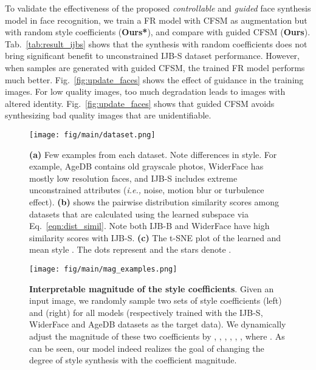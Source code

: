To validate the effectiveness of the proposed \emph{controllable} and \emph{guided} face synthesis model in face recognition, we train a FR model with CFSM as augmentation but with random style coefficients (\textbf{Ours*}), and compare with guided CFSM  (\textbf{Ours}). Tab.~\ref{tab:result_ijbs} shows that the synthesis with random coefficients does not bring significant benefit to unconstrained IJB-S dataset performance. However, when samples are generated with guided CFSM, the trained FR model performs much better. Fig.~\ref{fig:update_faces} shows the effect of guidance in the training images. For low quality images, too much degradation leads to images with altered identity. Fig.~\ref{fig:update_faces} shows that guided CFSM avoids synthesizing bad quality images that are unidentifiable.  




\begin{figure}[t]

\centering    
\texttt{[image: fig/main/dataset.png]}
\vspace{-2mm}
\caption{ \textbf{(a)} Few examples from each dataset. Note differences in style. For example, AgeDB contains old grayscale photos, WiderFace has mostly low resolution faces, and IJB-S includes extreme unconstrained attributes (\emph{i.e.,} noise, motion blur or turbulence effect). \textbf{(b)} shows the pairwise distribution similarity scores among datasets that are calculated using the learned subspace via Eq.~\ref{eqn:dist_simil}. Note both IJB-B and WiderFace have high similarity scores with IJB-S. \textbf{(c)} The t-SNE plot of the learned  and mean style . The dots represent  and the stars denote .} 
\vspace{-2mm}
\label{fig:dataset}
\end{figure}
 






\begin{figure}[t]
\centering
\texttt{[image: fig/main/mag\_examples.png]}
\caption{ \textbf{Interpretable magnitude of the style coefficients}. Given an input image, we randomly sample two sets of style coefficients  (left) and  (right) for all  models (respectively trained with the IJB-S, WiderFace and AgeDB datasets as the target data). We dynamically adjust the magnitude of these two coefficients by , , , , , , where .
As can be seen, our model indeed realizes the goal of changing the degree of style synthesis with the coefficient magnitude.
}
\label{fig:mag_examples}
\end{figure}


